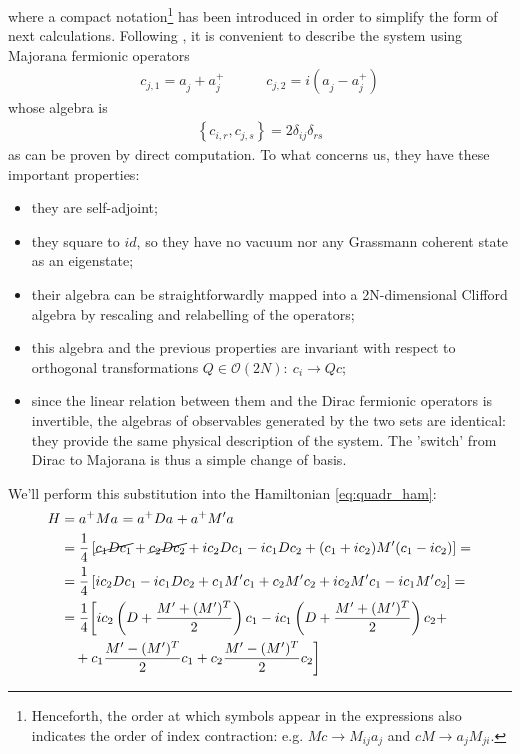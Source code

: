 \documentclass[a4paper,11pt]{article}
\newcommand{\np}{\vskip 1.3cm}
\begin{document}
 where a compact notation\footnote{Henceforth, the order at which symbols appear in the expressions also indicates the order of index contraction: e.g. $Mc\rightarrow M_{ij}a_j$ and $cM \rightarrow a_j M_{ji}$.} has been introduced in order to simplify the form of next calculations. \np
 Following \cite{Eisert2010}, it is convenient to describe the system using Majorana fermionic operators
 \begin{align}
  c_{j, 1} = a_j^{ }+a_j^{+} \quad \quad \quad
  c_{j, 2} = i(a_j^{ }-a_j^{+})
  \label{eq:def_majorana}
 \end{align}
  whose algebra is 
 \begin{align}
  \left\{c_{i,r},c_{j,s}\right\} = 2\delta_{ij}\delta_{rs}
  \label{eq:algebra_majorana}
 \end{align}
  as can be proven by direct computation. To what concerns us, they have these important properties:
  \begin{itemize}
   \item they are self-adjoint;
   \item they square to $id$, so they have no vacuum nor any Grassmann coherent state as an eigenstate;
   \item their algebra can be straightforwardly mapped into a 2N-dimensional Clifford algebra by rescaling and relabelling of the operators; 
   \item this algebra and the previous properties are invariant with respect to orthogonal transformations $Q\in\mathcal{O}(2N):\ c_i\rightarrow Qc$;
   \item since the linear relation between them and the Dirac fermionic operators is invertible, the algebras of observables generated by the two sets are identical: they provide the same physical description of the system. The 'switch' from Dirac to Majorana is thus a simple change of basis.
  \end{itemize}
  We'll perform this substitution into the Hamiltonian \ref{eq:quadr_ham}:
    \begin{align*}
     H &= a^+Ma^{ } = a^+Da^{ } + a^+M'a^{ }\notag\\
       &=\frac{1}{4}\left[\cancel{c_1Dc_1} + \cancel{c_2Dc_2} +ic_2Dc_1-ic_1Dc_2+(c_1+ic_2)M'(c_1-ic_2)\right] =  \notag\\
       &=\frac{1}{4}\left[ic_2Dc_1-ic_1Dc_2+c_1M'c_1 + c_2M'c_2 +ic_2M'c_1-ic_1M'c_2\right]=\notag \\
       &=\frac{1}{4}\bigg[ic_2\left(D+\frac{M'+(M')^T}{2}\right)c_1-ic_1\left(D+\frac{M'+(M')^T}{2}\right)c_2 +\notag\\
       &\ \ \ +c_1\frac{M'-(M')^T}{2}c_1+c_2\frac{M'-(M')^T}{2}c_2\bigg]\notag
   \end{align*}
\end{document}
